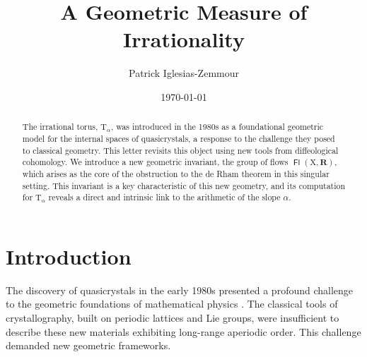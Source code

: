 \documentclass[10pt,letterpaper,reqno]{amsart}
\title{A Geometric Measure of Irrationality}
\author{Patrick Iglesias-Zemmour}
\date{\today}
\newcommand{\RR}{\mathbf{R}}
\newcommand{\T}{\mathrm{T}}
\newcommand{\X}{\mathrm{X}}
\DeclareMathOperator{\Fb}{\boldsymbol{\mathsf{Fl}}}
\begin{document}
  
  \maketitle
  
  
  \begin{abstract}
    The irrational torus,
    $\T_\alpha$,
    was introduced in the 1980s as a foundational geometric model for the internal spaces of quasicrystals,
    a response to the challenge they posed to classical geometry.
    This letter revisits this object using new tools from diffeological cohomology.
    We introduce a new geometric invariant,
    the group of flows $\Fb(\X, \RR)$,
    which arises as the core of the obstruction to the de Rham theorem in this singular setting.
    This invariant is a key characteristic of this new geometry,
    and its computation for $\T_\alpha$ reveals a direct and intrinsic link to the arithmetic of the slope $\alpha$.
  \end{abstract}
  
  
  
  
  
  \section*{Introduction}
    
  The discovery of quasicrystals in the early 1980s presented a profound challenge to the geometric foundations of mathematical physics \cite{She84}. The classical tools of crystallography, built on periodic lattices and Lie groups, were insufficient to describe these new materials exhibiting long-range aperiodic order. This challenge demanded new geometric frameworks.
  
\end{document}
